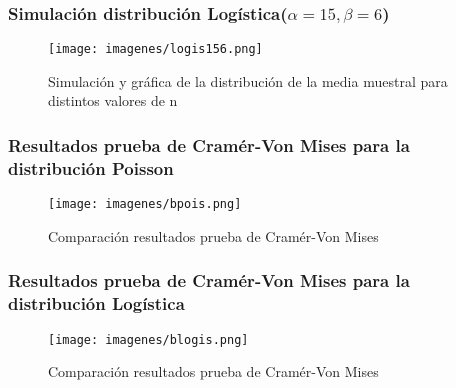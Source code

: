 \documentclass[12pt]{beamer}
\begin{document}
\begin{frame}
\frametitle{Simulación distribución Logística($\alpha=15,\beta=6$) }
\begin{figure}
\centering
\texttt{[image: imagenes/logis156.png]}
\caption{Simulación y gráfica de la distribución de la media muestral para distintos valores de n}\label{figura2}
\end{figure}
\end{frame}

\begin{frame}
\frametitle{Resultados prueba de Cramér-Von Mises para la distribución Poisson}
\begin{figure}
\centering
\texttt{[image: imagenes/bpois.png]}
\caption{Comparación resultados prueba de Cramér-Von Mises}\label{figura2}
\end{figure}
\end{frame}

\begin{frame}
\frametitle{Resultados prueba de Cramér-Von Mises para la distribución Logística}
\begin{figure}
\centering
\texttt{[image: imagenes/blogis.png]}
\caption{Comparación resultados prueba de Cramér-Von Mises}\label{figura2}
\end{figure}
\end{frame}
\end{document}
